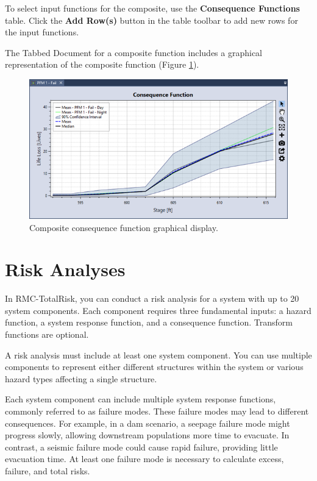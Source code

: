 \documentclass[
]{book}
\begin{document}
To select input functions for the composite, use the \textbf{Consequence Functions} table. Click the \textbf{Add Row(s)} button in the table toolbar to add new rows for the input functions.

The Tabbed Document for a composite function includes a graphical representation of the composite function (Figure \ref{fig:figure-122}).

\begin{figure}

{\centering \includegraphics{images/figure122} 

}

\caption{Composite consequence function graphical display.}\label{fig:figure-122}
\end{figure}

\hypertarget{risk-analyses}{%
\chapter{Risk Analyses}\label{risk-analyses}}

In RMC-TotalRisk, you can conduct a risk analysis for a system with up to 20 system components. Each component requires three fundamental inputs: a hazard function, a system response function, and a consequence function. Transform functions are optional.

A risk analysis must include at least one system component. You can use multiple components to represent either different structures within the system or various hazard types affecting a single structure.

Each system component can include multiple system response functions, commonly referred to as failure modes. These failure modes may lead to different consequences. For example, in a dam scenario, a seepage failure mode might progress slowly, allowing downstream populations more time to evacuate. In contrast, a seismic failure mode could cause rapid failure, providing little evacuation time. At least one failure mode is necessary to calculate excess, failure, and total risks.
\end{document}
